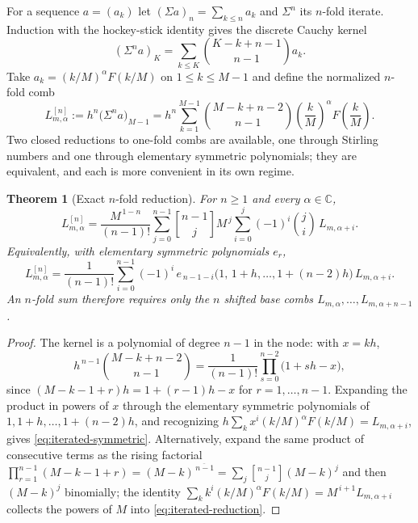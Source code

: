 \documentclass[11pt,oneside]{article}
\numberwithin{equation}{section}
\newtheorem{theorem}{Theorem}[section]
\theoremstyle{definition}
\theoremstyle{remark}
\newcommand{\C}{\mathbb C}
\newcommand{\rise}[2]{#1^{\overline{#2}}}
\newcommand{\stirlingfirst}[2]{\genfrac{[}{]}{0pt}{}{#1}{#2}}
\begin{document}
For a sequence $a=(a_k)$ let $(\Sigma a)_n=\sum_{k\le n}a_k$ and
$\Sigma^{n}$ its $n$-fold iterate.  Induction with the hockey-stick
identity gives the discrete Cauchy kernel
\begin{equation}
 (\Sigma^{n}a)_{K}
 =\sum_{k\le K}\binom{K-k+n-1}{n-1}a_k.
 \label{eq:prefix-kernel}
\end{equation}
Take $a_k=(k/M)^{\alpha}F(k/M)$ on $1\le k\le M-1$ and define the
normalized $n$-fold comb
\begin{equation}
 L^{[n]}_{m,\alpha}
 :=h^{n}\bigl(\Sigma^{n}a\bigr)_{M-1}
 =h^{n}\sum_{k=1}^{M-1}\binom{M-k+n-2}{n-1}
 \left(\frac kM\right)^{\alpha}F\!\left(\frac kM\right).
 \label{eq:iter-def}
\end{equation}
Two closed reductions to one-fold combs are available, one through
Stirling numbers and one through elementary symmetric polynomials;
they are equivalent, and each is more convenient in its own regime.

\begin{theorem}[Exact $n$-fold reduction]
\label{thm:iterated-reduction}
For $n\ge1$ and every $\alpha\in\C$,
\begin{equation}
 \boxed{\;
 L^{[n]}_{m,\alpha}
 =\frac{M^{\,1-n}}{(n-1)!}
 \sum_{j=0}^{n-1}\stirlingfirst{n-1}{j}M^{\,j}
 \sum_{i=0}^{j}(-1)^{i}\binom ji\,
 L_{m,\alpha+i}.
 \;}
 \label{eq:iterated-reduction}
\end{equation}
Equivalently, with elementary symmetric polynomials $e_r$,
\begin{equation}
 L^{[n]}_{m,\alpha}
 =\frac{1}{(n-1)!}
 \sum_{i=0}^{n-1}(-1)^{i}\,
 e_{\,n-1-i}\bigl(1,\,1{+}h,\dots,1{+}(n{-}2)h\bigr)\,
 L_{m,\alpha+i}.
 \label{eq:iterated-symmetric}
\end{equation}
An $n$-fold sum therefore requires only the $n$ shifted base combs
$L_{m,\alpha},\dots,L_{m,\alpha+n-1}$.
\end{theorem}

\begin{proof}
The kernel is a polynomial of degree $n-1$ in the node: with $x=kh$,
\[
 h^{\,n-1}\binom{M-k+n-2}{n-1}
 =\frac{1}{(n-1)!}\prod_{s=0}^{n-2}\bigl(1+sh-x\bigr),
\]
since $(M-k-1+r)h=1+(r-1)h-x$ for $r=1,\dots,n-1$.  Expanding the
product in powers of $x$ through the elementary symmetric polynomials
of $1,1{+}h,\dots,1{+}(n{-}2)h$, and recognizing
$h\sum_kx^{i}(k/M)^{\alpha}F(k/M)=L_{m,\alpha+i}$, gives
\eqref{eq:iterated-symmetric}.  Alternatively, expand the same product
of consecutive terms as the rising factorial
$\prod_{r=1}^{n-1}(M-k-1+r)=\rise{(M-k)}{\,n-1}
=\sum_{j}\stirlingfirst{n-1}{j}(M-k)^{j}$ and then $(M-k)^{j}$
binomially; the identity
$\sum_kk^{i}(k/M)^{\alpha}F(k/M)=M^{\,i+1}L_{m,\alpha+i}$ collects
the powers of $M$ into \eqref{eq:iterated-reduction}.
\end{proof}
\end{document}
